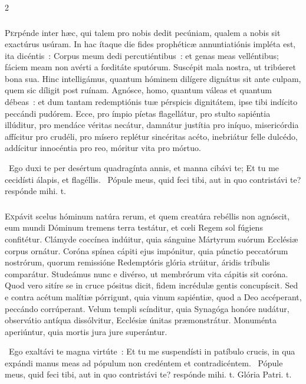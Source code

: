 \documentclass[9pt,twoside]{extarticle}
\begin{document}
\begin{multicols}{2}
\subsubsection*{\center{}}
\lettrine{P}erpénde inter hæc, qui talem pro nobis dedit pecúniam, qualem a nobis sit exactúrus usúram. In hac ítaque die fides prophéticæ annuntiatiónis impléta est, ita dicéntis~: Corpus meum dedi percutiéntibus~: et genas meas velléntibus; fáciem meam non avérti a fœditáte sputórum. Suscépit mala nostra, ut tribúeret bona sua. Hinc intelligámus, quantum hóminem dilígere dignátus sit ante culpam, quem sic díligit post ruínam. Agnósce, homo, quantum váleas et quantum débeas~: et dum tantam redemptiónis tuæ pérspicis dignitátem, ipse tibi indícito peccándi pudórem. Ecce, pro ímpio píetas flagellátur, pro stulto sapiéntia illúditur, pro mendáce véritas necátur, damnátur justítia pro iníquo, misericórdia affícitur pro crudéli, pro mísero replétur sincéritas acéto, inebriátur felle dulcédo, addícitur innocéntia pro reo, móritur vita pro mórtuo.

\begin{tightlist}{}
\item {}~Ego duxi te per desértum quadragínta annis, et manna cibávi te; \textred{*} Et tu me cecidísti álapis, et flagéllis. ~Pópule meus, quid feci tibi, aut in quo contristávi te? respónde mihi. t.
\end{tightlist}

\subsubsection*{\center{}}
\lettrine{E}xpávit scelus hóminum natúra rerum, et quem creatúra rebéllis non agnóscit, eum mundi Dóminum tremens terra testátur, et cœli Regem sol fúgiens confitétur. Clámyde coccínea indúitur, quia sánguine Mártyrum suórum Ecclésiæ corpus ornátur. Coróna spínea cápiti ejus impónitur, quia púnctio peccatórum nostrórum, quorum remissióne Redemptóris glória strúitur, áridis tríbulis comparátur. Studeámus nunc e divérso, ut membrórum vita cápitis sit coróna. Quod vero sitíre se in cruce pósitus dicit, fidem incrédulæ gentis concupíscit. Sed e contra acétum malítiæ pórrigunt, quia vinum sapiéntiæ, quod a Deo accéperant, peccándo corrúperant. Velum templi scínditur, quia Synagóga honóre nudátur, observátio antíqua dissólvitur, Ecclésiæ únitas præmonstrátur. Monuménta aperiúntur, quia mortis jura jure superántur.

\begin{tightlist}{}
\item {}~Ego exaltávi te magna virtúte~: \textred{*} Et tu me suspendísti in patíbulo crucis, in qua expándi manus meas ad pópulum non credéntem et contradicéntem. ~Pópule meus, quid feci tibi, aut in quo contristávi te? respónde mihi. t. Glória Patri. t.
\end{tightlist}

\end{multicols}
\end{document}
